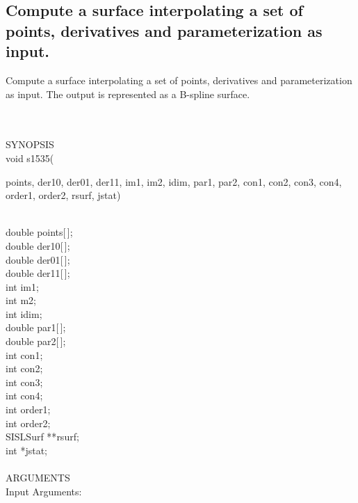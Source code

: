 \subsection{Compute a surface interpolating a set of points,
derivatives and parameterization as input.}
\begin{minipg1}
  Compute a surface interpolating a set of points, derivatives
  and parameterization as input.
  The output is represented as a B-spline surface.
\end{minipg1}\\ \\
SYNOPSIS\\
      \>void s1535(\begin{minipg3}
        {\fov points}, {\fov der10}, {\fov der01}, {\fov der11}, {\fov im1}, {\fov im2}, {\fov idim}, {\fov par1},  {\fov par2},
        {\fov con1}, {\fov con2}, {\fov con3}, {\fov con4}, {\fov order1},  {\fov order2}, {\fov rsurf}, {\fov jstat})
      \end{minipg3}\\[0.3ex]
      \>\>    double \> {\fov points}[\,];\\
      \>\>    double \> {\fov der10}[\,];\\
      \>\>    double \> {\fov der01}[\,];\\
      \>\>    double \> {\fov der11}[\,];\\
      \>\>    int    \> {\fov im1};\\
      \>\>    int    \> {\fov m2};\\
      \>\>    int    \> {\fov idim};\\
      \>\>    double \> {\fov par1}[\,];\\
      \>\>    double \> {\fov par2}[\,];\\
      \>\>    int    \> {\fov con1};\\
      \>\>    int    \> {\fov con2};\\
      \>\>    int    \> {\fov con3};\\
      \>\>    int    \> {\fov con4};\\
      \>\>    int    \> {\fov order1};\\
      \>\>    int    \> {\fov order2};\\
      \>\>    SISLSurf \> **{\fov rsurf};\\
      \>\>    int    \> *{\fov jstat};\\
\\
ARGUMENTS\\
        \>Input Arguments:\\
